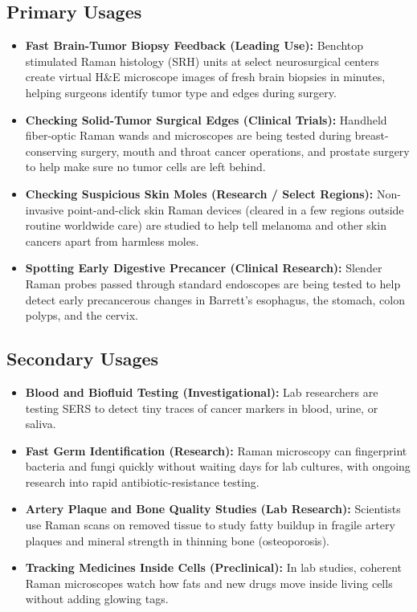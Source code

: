 \subsection{Primary Usages}
\begin{itemize}
  \item \textbf{Fast Brain-Tumor Biopsy Feedback (Leading Use):} Benchtop stimulated Raman histology (SRH) units at select neurosurgical centers create virtual H\&E microscope images of fresh brain biopsies in minutes, helping surgeons identify tumor type and edges during surgery.
  \item \textbf{Checking Solid-Tumor Surgical Edges (Clinical Trials):} Handheld fiber-optic Raman wands and microscopes are being tested during breast-conserving surgery, mouth and throat cancer operations, and prostate surgery to help make sure no tumor cells are left behind.
  \item \textbf{Checking Suspicious Skin Moles (Research / Select Regions):} Non-invasive point-and-click skin Raman devices (cleared in a few regions outside routine worldwide care) are studied to help tell melanoma and other skin cancers apart from harmless moles.
  \item \textbf{Spotting Early Digestive Precancer (Clinical Research):} Slender Raman probes passed through standard endoscopes are being tested to help detect early precancerous changes in Barrett's esophagus, the stomach, colon polyps, and the cervix.
\end{itemize}

\subsection{Secondary Usages}
\begin{itemize}
  \item \textbf{Blood and Biofluid Testing (Investigational):} Lab researchers are testing SERS to detect tiny traces of cancer markers in blood, urine, or saliva.
  \item \textbf{Fast Germ Identification (Research):} Raman microscopy can fingerprint bacteria and fungi quickly without waiting days for lab cultures, with ongoing research into rapid antibiotic-resistance testing.
  \item \textbf{Artery Plaque and Bone Quality Studies (Lab Research):} Scientists use Raman scans on removed tissue to study fatty buildup in fragile artery plaques and mineral strength in thinning bone (osteoporosis).
  \item \textbf{Tracking Medicines Inside Cells (Preclinical):} In lab studies, coherent Raman microscopes watch how fats and new drugs move inside living cells without adding glowing tags.
\end{itemize}

